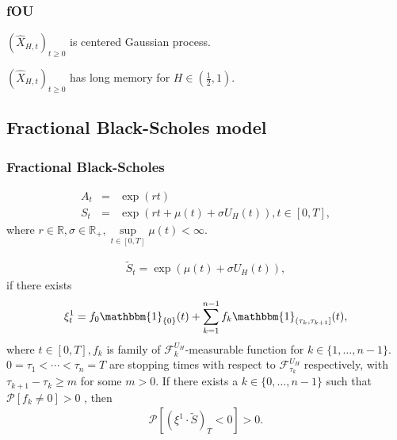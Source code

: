 \documentclass[]{beamer}
\newcommand{\brkt}[1]{\left({#1} \right)}
\begin{document}
\begin{frame}
  \frametitle{fOU}
  \begin{theorem}
	$(\hat{X}_{H,t})_{t\ge 0}$ is centered Gaussian process.
  \end{theorem}
  \begin{theorem}
	 $(\hat{X}_{H,t})_{t\ge 0}$ has long memory for $H\in (\frac{1}{2}, 1)$.
  \end{theorem}
\end{frame}

\subsection{Fractional Black-Scholes model}
\begin{frame}
  \frametitle{Fractional Black-Scholes}
  \begin{eqnarray*}
  A_t &=& \exp(rt)\nonumber\\
  S_t &=& \exp(rt + \mu(t) +\sigma U_H(t)), t\in [0, T],
  \label{sec:fbs2}
\end{eqnarray*}
\hspace{5em} where  $r\in\mathbb{R}, \sigma\in\mathbb{R}_+, \sup\limits_{t\in[0, T]}\mu(t) < \infty$.
\end{frame}

\begin{frame}
  \begin{theorem}
  \begin{eqnarray*}
	\tilde{S}_t = \exp\brkt{\mu(t) + \sigma U_H(t)},
	\label{sec:fbs}
  \end{eqnarray*}
  if there exists
  \begin{eqnarray*}
  \xi^1_t = f_0\mathbbm{1}_{\{0\}}(t)+\sum_{k=1}^{n-1} f_k \mathbbm{1}_{(\tau_k, \tau_{k+1}]}(t),
  \end{eqnarray*}
  where $t\in[0, T], f_k$ is family of  $\mathcal{F}^{U_H}_k $-measurable function for $k \in \{1,\dots,n-1\}$. $0 = \tau_1 < \cdots <\tau_n = T$ are stopping times with respect to $\mathcal{F}^{U_H}_{\tau_k} $ respectively,  with $\tau_{k+1} - \tau_k\ge m$ for some $m>0$. If there exists a $k \in \{0,\dots,n-1\}$ such that $\mathcal{P}[f_k\neq 0]>0$ , then
  \begin{eqnarray*}
	\mathcal{P}[(\xi^1 \cdot \tilde{S})_T < 0] > 0.
  \end{eqnarray*}
\end{theorem}
\end{frame}
\end{document}
